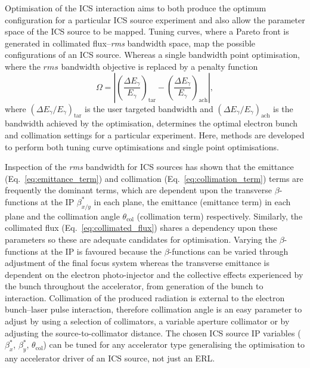 \documentclass[../main.tex]{subfiles}
\begin{document}
Optimisation of the ICS interaction aims to both produce the optimum configuration for a particular ICS source experiment and also allow the parameter space of the ICS source to be mapped. Tuning curves, where a Pareto front is generated in collimated flux--\textit{rms} bandwidth space, map the possible configurations of an ICS source. Whereas a single bandwidth point optimisation, where the $\textit{rms}$ bandwidth objective is replaced by a penalty function 
\begin{equation}
\Omega = \left|\left(\frac{\Delta E_{\gamma}}{E_{\gamma}}\right)_{\mathrm{tar}}-\left(\frac{\Delta E_{\gamma}}{E_{\gamma}}\right)_{\mathrm{ach}}\right|,
\label{eq:penalty_function}
\end{equation}
where $\left(\Delta E_{\gamma}/E_{\gamma}\right)_{\mathrm{tar}}$ is the user targeted bandwidth and $\left(\Delta E_{\gamma}/E_{\gamma}\right)_{\mathrm{ach}}$ is the bandwidth achieved by the optimisation, determines the optimal electron bunch and collimation settings for a particular experiment. Here, methods are developed to perform both tuning curve optimisations and single point optimisations.

Inspection of the \textit{rms} bandwidth for ICS sources has shown that the emittance (Eq.~\ref{eq:emittance_term}) and collimation (Eq.~\ref{eq:collimation_term}) terms are frequently the dominant terms, which are dependent upon the transverse $\beta$-functions at the IP $\beta^{*}_{x/y}$ in each plane, the emittance (emittance term) in each plane and the collimation angle $\theta_{\mathrm{col}}$ (collimation term) respectively. Similarly, the collimated flux (Eq.~\ref{eq:collimated_flux}) shares a dependency upon these parameters so these are adequate candidates for optimisation. Varying the $\beta$-functions at the IP is favoured because the $\beta$-functions can be varied through adjustment of the final focus system whereas the transverse emittance is dependent on the electron photo-injector and the collective effects experienced by the bunch throughout the accelerator, from generation of the bunch to interaction. Collimation of the produced radiation is external to the electron bunch--laser pulse interaction, therefore collimation angle is an easy parameter to adjust by using a selection of collimators, a variable aperture collimator or by adjusting the source-to-collimator distance. The chosen ICS source IP variables ($\beta^{*}_{x}$, $\beta^{*}_{y}$, $\theta_{\mathrm{col}}$) can be tuned for any accelerator type generalising the optimisation to any accelerator driver of an ICS source, not just an ERL.
\end{document}
